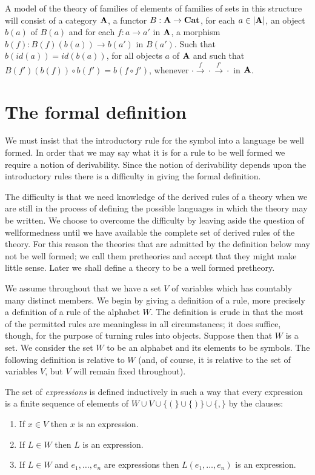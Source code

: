 A model of the theory of families of elements of families of sets in this structure will consist of a category $\mathbf{A}$, a functor $B:\mathbf{A}\to\mathbf{Cat}$, for each $a\in |\mathbf{A}|$, an object $b(a)$ of $B(a)$ and for each $f:a\to a'$ in $\mathbf{A}$, a morphism $b(f): B(f)(b(a))\to b(a')$ in $B(a')$.
%
Such that $b(id(a)) = id(b(a))$, for all objects $a$ of $\mathbf{A}$ and such that $B(f')(b(f))\circ b(f') = b(f\circ f')$, whenever $\cdot\xrightarrow{f}\cdot\xrightarrow{f'}\cdot$ in $\mathbf{A}$.


\section{The formal definition} \label{sec:source-1-6}
We must insist that the introductory rule for the symbol into a language be well formed.
%
In order that we may say what it is for a rule to be well formed we require a notion of derivability.
%
Since the notion of derivability depends upon the introductory rules there is a difficulty in giving the formal definition.


The difficulty is that we need knowledge of the derived rules of a theory when we are still in the process of defining the possible languages in which the theory may be written.
%
We choose to overcome the difficulty by leaving aside the question of wellformedness until we have available the complete set of derived rules of the theory.
%
For this reason the theories that are admitted by the definition below may not be well formed; we call them pretheories and accept that they might make little sense.
%
Later we shall define a theory to be a well formed pretheory.

We assume throughout that we have a set $V$ of variables which has countably many distinct members.
%
We begin by giving a definition of a rule, more precisely a definition of a rule of the alphabet $W$.
%
The definition is crude in that the most of the permitted rules are meaningless in all circumstances; it does suffice, though, for the purpose of turning rules into objects. Suppose then that $W$ is a set.
%
We consider the set $W$ to be an alphabet and its elements to be symbols.
%
The following definition is relative to $W$ (and, of course, it is relative to the set of variables $V$, but $V$ will remain fixed throughout).


The set of \emph{expressions} is defined inductively in such a way that every expression is a finite sequence of elements of $W\cup V\cup \{(\}\cup\{)\}\cup\{,\}$ by the clauses:
%
\begin{enumerate}
\item If $x\in V$ then $x$ is an expression.
\item If $L\in W$ then $L$ is an expression.
\item If $L\in W$ and $e_1,\ldots,e_n$ are expressions then $L(e_1,\ldots,e_n)$ is an expression.
\end{enumerate}


